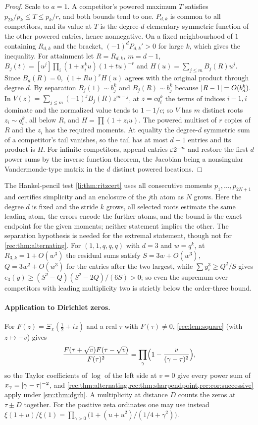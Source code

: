 \begin{proof}
Scale to $a=1$. A competitor's powered maximum $T$ satisfies $p_{2k}/p_k\le T\le p_k/r$, and both
bounds tend to one. $P_{d,k}$ is common to all competitors, and its value at $T$ is the degree-$d$
elementary symmetric function of the other powered entries, hence nonnegative. On a fixed
neighbourhood of $1$ containing $R_{d,k}$ and the bracket, $(-1)^dP_{d,k}'>0$ for large $k$, which
gives the inequality. For attainment let $R=R_{d,k}$, $m=d-1$,
$B_j(t)=[u^j]\prod_i(1+x_i^ku)(1+tu)^{-r}$ and $H(u)=\sum_{j\le m}B_j(R)u^j$. Since $B_d(R)=0$,
$(1+Ru)^rH(u)$ agrees with the original product through degree $d$. By separation $B_j(1)\sim b_j^k$
and $B_j(R)\sim b_j^k$ because $\lvert R-1\rvert=O(b_d^k)$. In
$V(z)=\sum_{j\le m}(-1)^jB_j(R)z^{m-j}$, at $z=cq_i^k$ the terms of indices $i-1,i$ dominate and the
normalized value tends to $1-1/c$; so $V$ has $m$ distinct roots $z_i\sim q_i^k$, all below $R$, and
$H=\prod(1+z_iu)$. The powered multiset of $r$ copies of $R$ and the $z_i$ has the required moments.
At equality the degree-$d$ symmetric sum of a competitor's tail vanishes, so the tail has at most
$d-1$ entries and its product is $H$. For infinite competitors, append entries $\varepsilon2^{-n}$ and
restore the first $d$ power sums by the inverse function theorem, the Jacobian being a nonsingular
Vandermonde-type matrix in the $d$ distinct powered locations.
\end{proof}

The Hankel-pencil test \cref{li:thm:ritzcert} uses all consecutive moments $p_1,\dots,p_{2N+1}$
and certifies simplicity and an enclosure of the $j$th atom as $N$ grows. Here the degree $d$ is
fixed and the stride $k$ grows, all selected roots estimate the same leading atom, the errors
encode the further atoms, and the bound is the exact endpoint for the given moments; neither
statement implies the other. The separation hypothesis is needed for the extremal statement, though not for
\cref{rec:thm:alternating}. For $(1,1,q,q,q)$ with $d=3$ and $w=q^k$, at $R_{3,k}=1+O(w^3)$ the
residual sums satisfy $S=3w+O(w^3)$, $Q=3w^2+O(w^3)$ for the entries after the two largest, while
$\sum y_i^3\ge Q^2/S$ gives $e_3(y)\ge(S^2-Q)(S^2-2Q)/(6S)>0$; so even the supremum over competitors
with leading multiplicity two is strictly below the order-three bound.

\paragraph{Application to Dirichlet zeros.}
For $F(z)=\Xi_\chi(\tfrac12+iz)$ and a real $\tau$ with $F(\tau)\ne0$, \cref{rec:lem:square} (with
$z\mapsto-v$) gives
\[
 \frac{F(\tau+\sqrt v)F(\tau-\sqrt v)}{F(\tau)^2}=\prod_\gamma\Bigl(1-\frac v{(\gamma-\tau)^2}\Bigr),
\]
so the Taylor coefficients of $\log$ of the left side at $v=0$ give every power sum of
$x_\gamma=\lvert\gamma-\tau\rvert^{-2}$, and \cref{rec:thm:alternating,rec:thm:sharpendpoint,rec:cor:successive}
apply under \cref{src:thm:dgrh}. A multiplicity at distance $D$ counts the zeros at $\tau\pm D$
together. For the positive zeta ordinates one may use instead
$\xi(1+u)/\xi(1)=\prod_{\gamma>0}\bigl(1+(u+u^2)/(1/4+\gamma^2)\bigr)$.

